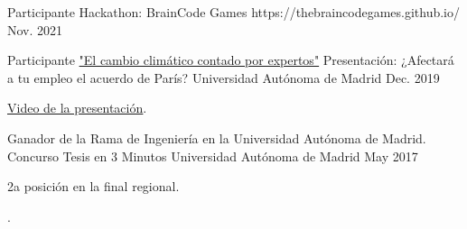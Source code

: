 \begin{cventries}
  \cventry
    {Participante} %
    {Hackathon: BrainCode Games} %
    {https://thebraincodegames.github.io/} %
    {Nov. 2021} %
    {}


  \cventry
    {Participante \href{https://workshops.ift.uam-csic.es/cambioclimatico/Programa}{"El cambio climático contado por expertos"}} %
    {Presentación: ¿Afectará a tu empleo el acuerdo de París?} %
    {Universidad Autónoma de Madrid} %
    {Dec. 2019} %
    {
    \begin{cvitems} %
        \item {\underline{\href{https://m.youtube.com/watch?v=rB3-6bywW_Q}{Video de la presentación}}.}        	\end{cvitems}
    }


  \cventry
    {Ganador de la Rama de Ingeniería en la Universidad Autónoma de Madrid.} %
    {Concurso Tesis en 3 Minutos} %
    {Universidad Autónoma de Madrid} %
    {May 2017} %
    {
      \begin{cvitems} %
        \item {2a posición en la final regional.}
      \end{cvitems}
    }.

\end{cventries}